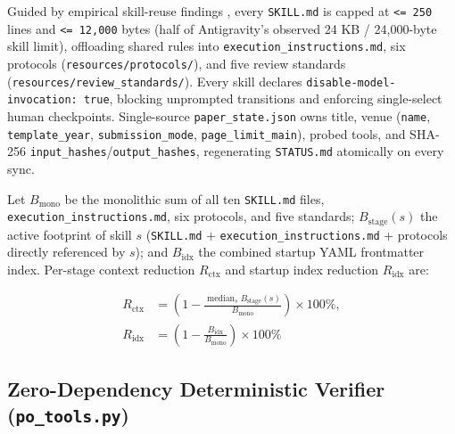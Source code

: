 Guided by empirical skill-reuse findings \citep{zhang2026reusable, li2026skillsbench}, every \texttt{SKILL.\allowbreak{}md} is capped at \texttt{\textless{}=\ 250} lines and \texttt{\textless{}=\ 12,\allowbreak{}000} bytes (half of Antigravity's observed 24 KB / 24,000-byte skill limit), offloading shared rules into \texttt{execution\_\allowbreak{}instructions.\allowbreak{}md}, six protocols (\texttt{resources/\allowbreak{}protocols/}), and five review standards (\texttt{resources/\allowbreak{}review\_\allowbreak{}standards/}). Every skill declares \texttt{disable-model-invocation:\ true}, blocking unprompted transitions and enforcing single-select human checkpoints. Single-source \texttt{paper\_\allowbreak{}state.\allowbreak{}json} owns title, venue (\texttt{name}, \texttt{template\_\allowbreak{}year}, \texttt{submission\_\allowbreak{}mode}, \texttt{page\_\allowbreak{}limit\_\allowbreak{}main}), probed tools, and SHA-256 \texttt{input\_\allowbreak{}hashes}/\allowbreak{}\texttt{output\_\allowbreak{}hashes}, regenerating \texttt{STATUS.\allowbreak{}md} atomically on every sync.

Let \(B_{\text{mono}}\) be the monolithic sum of all ten \texttt{SKILL.\allowbreak{}md} files, \texttt{execution\_\allowbreak{}instructions.\allowbreak{}md}, six protocols, and five standards; \(B_{\text{stage}}(s)\) the active footprint of skill \(s\) (\texttt{SKILL.\allowbreak{}md} + \texttt{execution\_\allowbreak{}instructions.\allowbreak{}md} + protocols directly referenced by \(s\)); and \(B_{\text{idx}}\) the combined startup YAML frontmatter index. Per-stage context reduction \(R_{\text{ctx}}\) and startup index reduction \(R_{\text{idx}}\) are:

\begin{equation}
\begin{aligned}
R_{\text{ctx}} &= \left(1 - \frac{\operatorname{median}_{s} B_{\text{stage}}(s)}{B_{\text{mono}}}\right) \times 100\%, \\
R_{\text{idx}} &= \left(1 - \frac{B_{\text{idx}}}{B_{\text{mono}}}\right) \times 100\%
\end{aligned}
\label{eq:context-reduction}
\end{equation}

\hypertarget{sec:method-verifier}{%
\subsection{\texorpdfstring{Zero-Dependency Deterministic Verifier (\texttt{po\_\allowbreak{}tools.\allowbreak{}py})}{Zero-Dependency Deterministic Verifier (po\_tools.py)}}\label{sec:method-verifier}}


